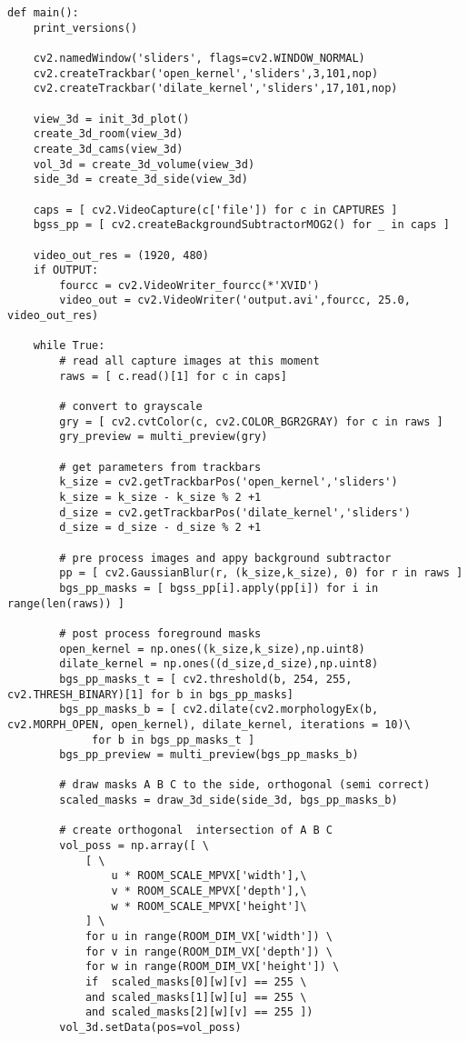 \begin{lstlisting}[caption={Main function of the volume intersection program}, label={lst:app:volmain}]
def main():
    print_versions()

    cv2.namedWindow('sliders', flags=cv2.WINDOW_NORMAL)
    cv2.createTrackbar('open_kernel','sliders',3,101,nop)
    cv2.createTrackbar('dilate_kernel','sliders',17,101,nop)

    view_3d = init_3d_plot()
    create_3d_room(view_3d)
    create_3d_cams(view_3d)
    vol_3d = create_3d_volume(view_3d)
    side_3d = create_3d_side(view_3d)

    caps = [ cv2.VideoCapture(c['file']) for c in CAPTURES ]
    bgss_pp = [ cv2.createBackgroundSubtractorMOG2() for _ in caps ]

    video_out_res = (1920, 480)
    if OUTPUT:
        fourcc = cv2.VideoWriter_fourcc(*'XVID')
        video_out = cv2.VideoWriter('output.avi',fourcc, 25.0, video_out_res)

    while True:
        # read all capture images at this moment
        raws = [ c.read()[1] for c in caps]

        # convert to grayscale
        gry = [ cv2.cvtColor(c, cv2.COLOR_BGR2GRAY) for c in raws ]
        gry_preview = multi_preview(gry)

        # get parameters from trackbars
        k_size = cv2.getTrackbarPos('open_kernel','sliders')
        k_size = k_size - k_size % 2 +1
        d_size = cv2.getTrackbarPos('dilate_kernel','sliders')
        d_size = d_size - d_size % 2 +1

        # pre process images and appy background subtractor
        pp = [ cv2.GaussianBlur(r, (k_size,k_size), 0) for r in raws ]
        bgs_pp_masks = [ bgss_pp[i].apply(pp[i]) for i in range(len(raws)) ]

        # post process foreground masks
        open_kernel = np.ones((k_size,k_size),np.uint8)
        dilate_kernel = np.ones((d_size,d_size),np.uint8)
        bgs_pp_masks_t = [ cv2.threshold(b, 254, 255, cv2.THRESH_BINARY)[1] for b in bgs_pp_masks]
        bgs_pp_masks_b = [ cv2.dilate(cv2.morphologyEx(b, cv2.MORPH_OPEN, open_kernel), dilate_kernel, iterations = 10)\
             for b in bgs_pp_masks_t ]
        bgs_pp_preview = multi_preview(bgs_pp_masks_b)

        # draw masks A B C to the side, orthogonal (semi correct)
        scaled_masks = draw_3d_side(side_3d, bgs_pp_masks_b)

        # create orthogonal  intersection of A B C
        vol_poss = np.array([ \
            [ \
                u * ROOM_SCALE_MPVX['width'],\
                v * ROOM_SCALE_MPVX['depth'],\
                w * ROOM_SCALE_MPVX['height']\
            ] \
            for u in range(ROOM_DIM_VX['width']) \
            for v in range(ROOM_DIM_VX['depth']) \
            for w in range(ROOM_DIM_VX['height']) \
            if  scaled_masks[0][w][v] == 255 \
            and scaled_masks[1][w][u] == 255 \
            and scaled_masks[2][w][v] == 255 ])
        vol_3d.setData(pos=vol_poss)


\end{lstlisting}
